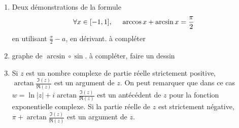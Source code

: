\begin{rems}
 \begin{enumerate}
\item Deux démonstrations de la formule
\begin{displaymath}
 \forall x \in [-1,1],\hspace{0.5cm}\arccos x + \arcsin x = \frac{\pi}{2}
\end{displaymath}
en utilisant $\frac{\pi}{2}-a$, en dérivant. à compléter
 \item graphe de $\arcsin \circ \sin$. à compléter, faire un dessin 
  \item Si $z$ est un nombre complexe de partie réelle strictement positive, $\arctan \frac{\Im(z)}{\Re(z)}$ est un argument de $z$. On peut remarquer que dans ce cas $w= \ln |z|+i\arctan \frac{\Im(z)}{\Re(z)}$ est un antécédent de $z$ pour la fonction exponentielle complexe. Si la partie réelle de $z$ est strictement négative, $\pi +\arctan \frac{\Im(z)}{\Re(z)}$ est un argument de $z$.
 \end{enumerate}
\end{rems}

